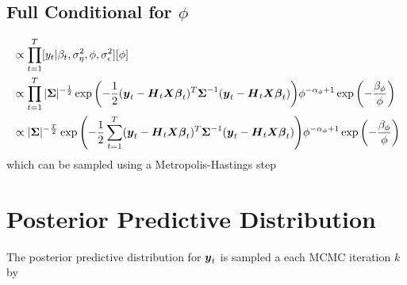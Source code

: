 \documentclass[fleqn]{article}
\def\bm#1{\mbox{\boldmath $#1$}}
\begin{document}
\subsection{Full Conditional for $\phi$}
%
\begin{align*}
  [\phi | \cdot] & \propto \prod_{t = 1}^T [y_t | \beta_t, \sigma^2_\eta, \phi, \sigma^2_\epsilon] [\phi]\\
%
& \propto \prod_{t = 1}^T | \bm{\Sigma} |^{ - \frac{1} {2}} \exp{ \left( - \frac{1} {2} (\bm{y}_t - \bm{H}_t \bm{X} \bm{\beta}_t)^T \bm{\Sigma}^{ - 1} (\bm{y}_t - \bm{H}_t \bm{X} \bm{\beta}_t) \right) } \phi^{ - \alpha_\phi + 1} \exp{ \left( - \frac{\beta_\phi} {\phi} \right) }\\
%
& \propto | \bm{\Sigma} |^{ - \frac{T} {2}} \exp{ \left( - \frac{1} {2} \sum_{t = 1}^T (\bm{y}_t - \bm{H}_t \bm{X} \bm{\beta}_t)^T \bm{\Sigma}^{ - 1} (\bm{y}_t - \bm{H}_t \bm{X} \bm{\beta}_t) \right) } \phi^{ - \alpha_\phi + 1} \exp{ \left( - \frac{\beta_\phi} {\phi} \right) }\\
\end{align*}
% 
which can be sampled using a Metropolis-Hastings step
%
\section{Posterior Predictive Distribution}
%
The posterior predictive distribution for $\bm{y}_t$ is sampled a each MCMC iteration $k$ by

% 
%     
\end{document}
